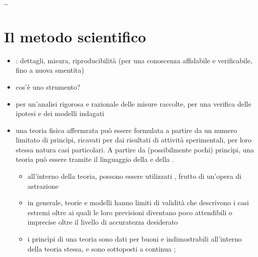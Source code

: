 \documentclass[letterpaper,10pt,italian]{jupyterBook}
\begin{document}
\sphinxAtStartPar
…

\sphinxstepscope


\chapter{Il metodo scientifico}
\label{\detokenize{ch/intro/scientific-method:il-metodo-scientifico}}\label{\detokenize{ch/intro/scientific-method:physics-hs-intro-scientific-method}}\label{\detokenize{ch/intro/scientific-method::doc}}\begin{itemize}
\item {} 
\sphinxAtStartPar
{}: dettagli, misura, riproducibilità (per una conoscenza affidabile e verificabile, fino a nuova smentita)

\item {} 
\sphinxAtStartPar
{} cos’è uno strumento?

\item {} 
\sphinxAtStartPar
{} per un’analisi rigorosa e razionale delle misure raccolte, per una verifica delle ipotesi e dei modelli indagati

\item {} 
\sphinxAtStartPar
{} una teoria fisica affermrata può essere formulata a partire da un numero limitato di princìpi, ricavati per  dai risultati di attività sperimentali, per loro stessa natura casi particolari. A partire da (possibilmente pochi) princìpi, una teoria può essere  tramite il linguaggio della  e della .
\begin{itemize}
\item {} 
\sphinxAtStartPar
all’interno della teoria, possono essere utilizzati , frutto di un’opera di astrazione

\item {} 
\sphinxAtStartPar
in generale, teorie e modelli hanno limiti di validità che descrivono i casi estremi oltre ai quali le loro previsioni diventano poco attendibili o imprecise oltre il livello di accuratezza desiderato

\item {} 
\sphinxAtStartPar
i princìpi di una teoria sono dati per buoni e indimostrabili all’interno della teoria stessa, e sono sottoposti a continua ; 

\end{itemize}

\end{itemize}
\end{document}
